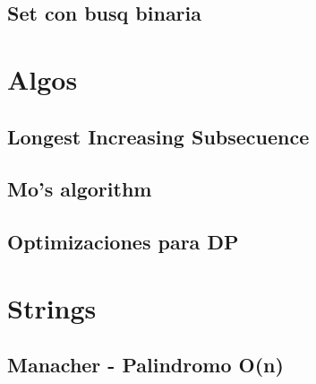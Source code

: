 \subsection{Set con busq binaria}

\section{Algos}%
\subsection{Longest Increasing Subsecuence}
\subsection{Mo's algorithm}
\subsection{Optimizaciones para DP} %

\section{Strings}%
\subsection{Manacher - Palindromo O(n)}
